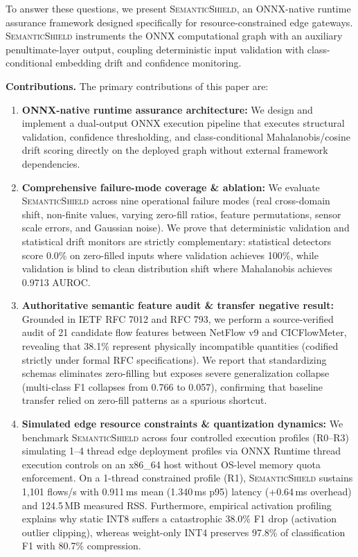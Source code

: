\documentclass[journal]{IEEEtran}
\newcommand{\sysname}{\textsc{SemanticShield}}
\begin{document}
To answer these questions, we present \sysname{}, an ONNX-native runtime assurance framework designed specifically for resource-constrained edge gateways. \sysname{} instruments the ONNX computational graph with an auxiliary penultimate-layer output, coupling deterministic input validation with class-conditional embedding drift and confidence monitoring.

\textbf{Contributions.} The primary contributions of this paper are:
\begin{enumerate}[leftmargin=*]
  \item \textbf{ONNX-native runtime assurance architecture:} We design and implement a dual-output ONNX execution pipeline that executes structural validation, confidence thresholding, and class-conditional Mahalanobis/cosine drift scoring directly on the deployed graph without external framework dependencies.
  \item \textbf{Comprehensive failure-mode coverage \& ablation:} We evaluate \sysname{} across nine operational failure modes (real cross-domain shift, non-finite values, varying zero-fill ratios, feature permutations, sensor scale errors, and Gaussian noise). We prove that deterministic validation and statistical drift monitors are strictly complementary: statistical detectors score 0.0\% on zero-filled inputs where validation achieves 100\%, while validation is blind to clean distribution shift where Mahalanobis achieves 0.9713 AUROC.
  \item \textbf{Authoritative semantic feature audit \& transfer negative result:} Grounded in IETF RFC 7012 and RFC 793, we perform a source-verified audit of 21 candidate flow features between NetFlow v9 and CICFlowMeter, revealing that 38.1\% represent physically incompatible quantities (codified strictly under formal RFC specifications). We report that standardizing schemas eliminates zero-filling but exposes severe generalization collapse (multi-class F1 collapses from 0.766 to 0.057), confirming that baseline transfer relied on zero-fill patterns as a spurious shortcut.
  \item \textbf{Simulated edge resource constraints \& quantization dynamics:} We benchmark \sysname{} across four controlled execution profiles (R0--R3) simulating 1--4 thread edge deployment profiles via ONNX Runtime thread execution controls on an x86\_64 host without OS-level memory quota enforcement. On a 1-thread constrained profile (R1), \sysname{} sustains 1,101 flows/s with 0.911\,ms mean (1.340\,ms p95) latency (+0.64\,ms overhead) and 124.5\,MB measured RSS. Furthermore, empirical activation profiling explains why static INT8 suffers a catastrophic 38.0\% F1 drop (activation outlier clipping), whereas weight-only INT4 preserves 97.8\% of classification F1 with 80.7\% compression.
\end{enumerate}
\end{document}
